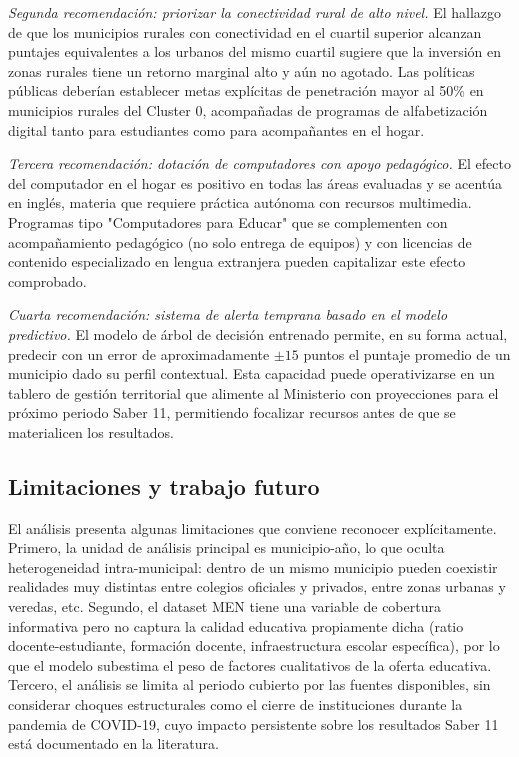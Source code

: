\textit{Segunda recomendación: priorizar la conectividad rural de alto nivel.} El hallazgo de que los municipios rurales con conectividad en el cuartil superior alcanzan puntajes equivalentes a los urbanos del mismo cuartil sugiere que la inversión en zonas rurales tiene un retorno marginal alto y aún no agotado. Las políticas públicas deberían establecer metas explícitas de penetración mayor al 50\% en municipios rurales del Cluster 0, acompañadas de programas de alfabetización digital tanto para estudiantes como para acompañantes en el hogar.

\textit{Tercera recomendación: dotación de computadores con apoyo pedagógico.} El efecto del computador en el hogar es positivo en todas las áreas evaluadas y se acentúa en inglés, materia que requiere práctica autónoma con recursos multimedia. Programas tipo "Computadores para Educar" que se complementen con acompañamiento pedagógico (no solo entrega de equipos) y con licencias de contenido especializado en lengua extranjera pueden capitalizar este efecto comprobado.

\textit{Cuarta recomendación: sistema de alerta temprana basado en el modelo predictivo.} El modelo de árbol de decisión entrenado permite, en su forma actual, predecir con un error de aproximadamente $\pm 15$ puntos el puntaje promedio de un municipio dado su perfil contextual. Esta capacidad puede operativizarse en un tablero de gestión territorial que alimente al Ministerio con proyecciones para el próximo periodo Saber 11, permitiendo focalizar recursos antes de que se materialicen los resultados.

\subsection{Limitaciones y trabajo futuro}
El análisis presenta algunas limitaciones que conviene reconocer explícitamente. Primero, la unidad de análisis principal es municipio-año, lo que oculta heterogeneidad intra-municipal: dentro de un mismo municipio pueden coexistir realidades muy distintas entre colegios oficiales y privados, entre zonas urbanas y veredas, etc. Segundo, el dataset MEN tiene una variable de cobertura informativa pero no captura la calidad educativa propiamente dicha (ratio docente-estudiante, formación docente, infraestructura escolar específica), por lo que el modelo subestima el peso de factores cualitativos de la oferta educativa. Tercero, el análisis se limita al periodo cubierto por las fuentes disponibles, sin considerar choques estructurales como el cierre de instituciones durante la pandemia de COVID-19, cuyo impacto persistente sobre los resultados Saber 11 está documentado en la literatura.

